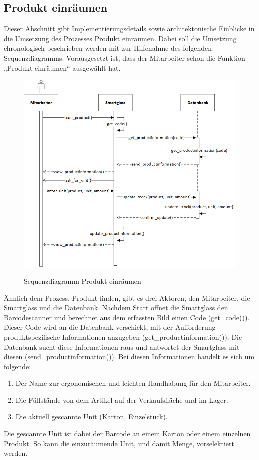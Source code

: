 \subsection{Produkt einräumen}
Dieser Abschnitt gibt Implementierungsdetails sowie architektonische Einblicke in die Umsetzung des Prozesses \glqq Produkt einräumen\grqq . Dabei soll die Umsetzung chronologisch beschrieben werden mit zur Hilfenahme des folgenden Sequenzdiagramms. Vorausgesetzt ist, dass der Mitarbeiter schon die Funktion „Produkt einräumen“ ausgewählt hat. 
\begin{figure}[H]
	\centering
	{\includegraphics[scale=0.7]{Bilder/Abbildungen/SMAR_produkt_einraeumen_Sequenzdiagramm.png}}
	\caption{Sequenzdiagramm Produkt einräumen}
	\label{fig:jwt_encode}
\end{figure}
Ähnlich dem Prozess, Produkt finden, gibt es drei Aktoren, den Mitarbeiter, die Smartglass und die Datenbank. Nachdem Start öffnet die Smartglass den Barcodescanner und berechnet aus dem erfassten Bild einen Code (get\_code()). Dieser Code wird an die Datenbank verschickt, mit der Aufforderung produktspezifische Informationen anzugeben (get\_productinformation()). Die Datenbank sucht diese Informationen raus und antwortet der Smartglass mit diesen (send\_productinformation()). Bei diesen Informationen handelt es sich um folgende: 
\begin{enumerate}
	\item Der Name zur ergonomischen und leichten Handhabung für den Mitarbeiter.
	\item Die Füllstände von dem Artikel auf der Verkaufsfläche und im  Lager.
	\item Die aktuell gescannte Unit (Karton, Einzelstück).
\end{enumerate}
Die gescannte Unit ist dabei der Barcode an einem Karton oder einem einzelnen Produkt. So kann die einzuräumende Unit, und damit Menge, vorselektiert werden. 

